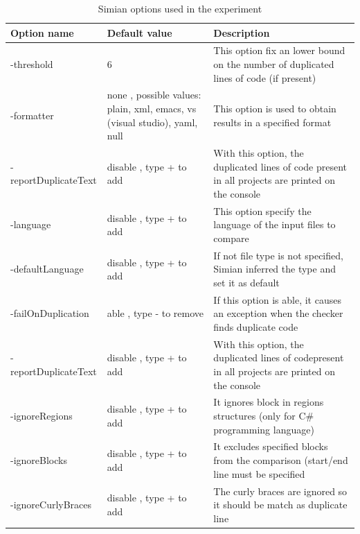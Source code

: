 \begin{center}
	\begin{table}[!h]
		\caption{ Simian options used in the experiment }
		\label{Table:3}
		\begin{adjustbox}{width=1\textwidth}
			\small
			\begin{tabular}{|l|p{4cm}|p{6cm}|}
				
				\hline
				
				\textbf{Option name} & \textbf{Default value} & 
				\textbf{Description} \\
				\hline
				-threshold & 6 &This option fix an lower bound on the number   
				of duplicated lines of code (if present)  \\
				\hline
				-formatter &  none , possible values: plain, xml, emacs,    vs 
				(visual studio), yaml, null &   This option is used to obtain 
				results in a specified format\\
				\hline
				-reportDuplicateText & disable , type + to add &   With this 
				option, the duplicated lines of code  present in all projects 
				are printed on the console    \\
				\hline
				-language & disable , type + to add &  This option specify the  
				language of the input files to compare   \\
				\hline
				-defaultLanguage & disable , type + to add &   If not file type 
				is not specified, Simian inferred the type and set it as 
				default    \\
				\hline
				-failOnDuplication & able , type - to remove & If this option 
				is able, it causes  an exception when the checker finds 
				duplicate code     \\
				\hline
				-reportDuplicateText & disable , type + to add & With this 
				option, the duplicated lines of codepresent in all projects are 
				printed on the console    \\
				\hline
				-ignoreRegions & disable , type + to add & It ignores block in 
				regions structures (only for C\# programming language)  \\
				\hline
				-ignoreBlocks & disable , type + to add &  It excludes 
				specified blocks  from the comparison (start/end line must be 
				specified  \\
				\hline
				-ignoreCurlyBraces & disable , type + to add & The curly braces 
				are ignored  so it should be match as duplicate line \\
				

\end{tabular}
\end{adjustbox}
\end{table}
\end{center}

